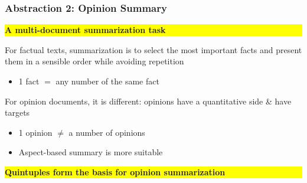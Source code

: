 \documentclass[t]{beamer}
\begin{document}

\begin{frame} \frametitle{Abstraction 2: Opinion Summary} %


\colorbox{yellow}{\parbox{0.9 \textwidth} {\textbf{A multi-document summarization task}}}

\vfill
For factual texts, summarization is to select the most important facts
and present them in a sensible order while avoiding repetition \\
\begin{itemize}
\item 1 fact $=$ any number of the same fact
\end{itemize}

\vfill
For opinion documents, it is different:  opinions have a quantitative side \& have targets
 \begin{itemize}
\item 1 opinion  $\ne$ a number of opinions \\
\item Aspect-based summary is more suitable 
\end{itemize}

\vfill
\colorbox{yellow}{\parbox{0.9 \textwidth} {\textbf{Quintuples form the basis for opinion summarization}}}

\end{frame} 
\end{document}
